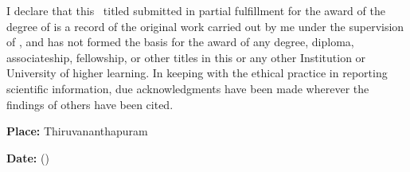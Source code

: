 I declare that this \Doctype \ titled \textbf{\textit{\Title}} submitted in
partial fulfillment for the award of the degree of
{\bf\Degreetext} is a record of the original work carried out by me
under the supervision of {\bf\Advisor}, and has not formed the basis for the
award of any degree, diploma, associateship, fellowship, or other titles in
this or any other Institution or University of higher learning. In keeping
with the ethical practice in reporting scientific information, due
acknowledgments have been made wherever the findings of others have been
cited.

\vspace{15mm}

\noindent\textbf{Place: }Thiruvananthapuram\hfill \Author \hspace{5mm}

\noindent\textbf{Date: }\Date \hfill (\Studentid)\hspace{3mm}
